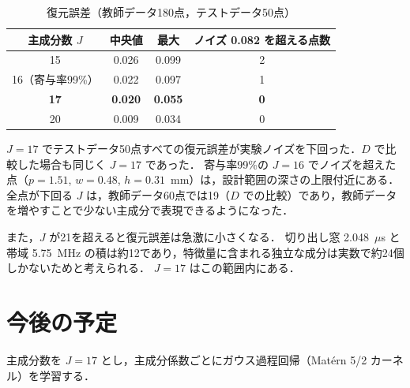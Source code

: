 \documentclass{jarticle}
\begin{document}
\begin{table}[htbp]
 \centering
 \caption{復元誤差（教師データ180点，テストデータ50点）}
 \label{tab:rec}
 \begin{tabular}{c|ccc} \hline
  主成分数 $J$ & 中央値 & 最大 & ノイズ 0.082 を超える点数 \\ \hline
  15 & 0.026 & 0.099 & 2 \\
  16（寄与率99\%） & 0.022 & 0.097 & 1 \\
  \textbf{17} & \textbf{0.020} & \textbf{0.055} & \textbf{0} \\
  20 & 0.009 & 0.034 & 0 \\ \hline
 \end{tabular}
\end{table}

$J=17$ でテストデータ50点すべての復元誤差が実験ノイズを下回った．$D$ で比較した場合も同じく $J=17$ であった．
寄与率99\%の $J=16$ でノイズを超えた点（$p=1.51$, $w=0.48$, $h=0.31$~mm）は，設計範囲の深さの上限付近にある．
全点が下回る $J$ は，教師データ60点では19（$D$ での比較）であり，教師データを増やすことで少ない主成分で表現できるようになった．

また，$J$ が21を超えると復元誤差は急激に小さくなる．
切り出し窓 2.048~$\mu$s と帯域 5.75~MHz の積は約12であり，特徴量に含まれる独立な成分は実数で約24個しかないためと考えられる．
$J=17$ はこの範囲内にある．

\section{今後の予定}
主成分数を $J=17$ とし，主成分係数ごとにガウス過程回帰（Mat\'{e}rn 5/2 カーネル）を学習する．
\end{document}
